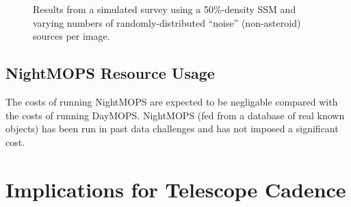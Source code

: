 \documentclass[12pt,preprint]{aastex}
\begin{document}
\begin{figure}

\caption{Results from a simulated survey using a 50\%-density SSM and
  varying numbers of randomly-distributed ``noise'' (non-asteroid)
  sources per image.}
\label{noiseDensity}
\end{figure}






\subsection{NightMOPS Resource Usage}

The costs of running NightMOPS are expected to be negligable compared
with the costs of running DayMOPS.  NightMOPS (fed from a database of
real known objects) has been run in past data challenges and has not
imposed a significant cost. 











\section{Implications for Telescope Cadence}
\label{cadenceRequirements}
\end{document}
